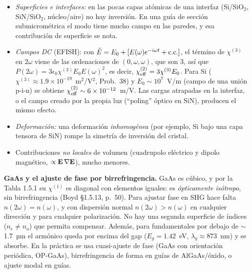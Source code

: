 \begin{itemize}
\item \emph{Superficies e interfaces:} en las pocas capas atómicas de una interfaz (Si/SiO$_2$, SiN/SiO$_2$, núcleo/aire) no hay inversión. En una guía de
sección submicrométrica el modo tiene mucho campo en las paredes, y esa contribución de superficie se nota.
\item \emph{Campos DC} (EFISH): con $\tilde E=E_0+[E(\omega)e^{-i\omega t}+\text{c.c.}]$, el término de $\chi^{(3)}$ en $2\omega$ viene de las ordenaciones de $(0,\omega,\omega)$, que son 3, así que
$P(2\omega)=3\epsilon_0\chi^{(3)}E_0E(\omega)^2$, es decir, $\chi^{(2)}_{\rm eff}=3\chi^{(3)}E_0$. Para Si ($\chi^{(3)}\approx1.9\times10^{-19}$~m$^2$/V$^2$, Prob.~38) y $E_0\sim10^7$~V/m
(campo de una unión p-i-n) se obtiene $\chi^{(2)}_{\rm eff}\sim6\times10^{-12}$~m/V. Las cargas atrapadas en la interfaz, o el campo creado por la propia luz
(``poling'' óptico en SiN), producen el mismo efecto.
\item \emph{Deformación:} una deformación \emph{inhomogénea} (por ejemplo, Si bajo una capa tensora de SiN) rompe la simetría de inversión del cristal.
\item Contribuciones \emph{no locales} de volumen (cuadrupolo eléctrico y dipolo magnético, $\propto\mathbf E\,\nabla\mathbf E$), mucho menores.
\end{itemize}

 \textbf{GaAs y el ajuste de fase por birrefringencia.} GaAs es cúbico, y por la Tabla 1.5.1 su $\chi^{(1)}$ es diagonal con elementos iguales: es
\emph{ópticamente isótropo}, sin birrefringencia (Boyd §1.5.13, p.~50). Para ajustar fase en SHG hace falta $n(2\omega)=n(\omega)$, y con dispersión
normal $n(2\omega)>n(\omega)$ en cualquier dirección y para cualquier polarización. No hay una segunda superficie de índices ($n_e\neq n_o$) que permita compensar.
Además, para fundamentales por debajo de $\sim$1.7~µm el armónico queda por encima del gap ($E_g=1.42$~eV, $\lambda_g\approx873$~nm) y se absorbe.
En la práctica se usa cuasi-ajuste de fase (GaAs con orientación periódica, OP-GaAs), birrefringencia de forma en guías de AlGaAs/óxido, o ajuste modal en guías.


